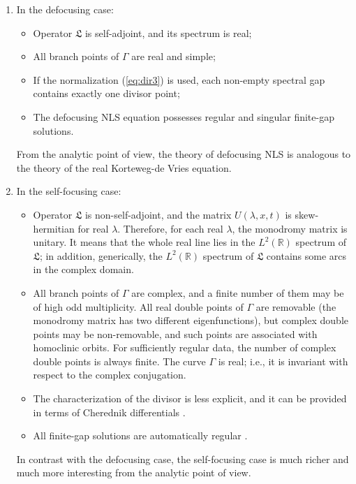 \documentclass[12pt]{article}
\newcommand{\RR}{\mathbb R}
\newcommand{\LG}{\mathfrak L}
\begin{document}
\begin{enumerate}
\item In the defocusing case:
\begin{itemize}
\item Operator $\LG$ is self-adjoint, and its spectrum is real; 
\item All branch points of $\Gamma$ are real and simple;
\item If the normalization (\ref{eq:dir3}) is used, each non-empty spectral gap contains exactly one divisor point;
\item The defocusing NLS equation possesses regular and singular finite-gap solutions. 
\end{itemize}
From the analytic point of view, the theory of defocusing NLS is analogous to the theory of the real Korteweg-de Vries equation.
\item In the self-focusing case:
\begin{itemize}
\item Operator $\LG$ is non-self-adjoint, and the matrix $U(\lambda,x,t)$ is skew-hermitian for real $\lambda$. Therefore, for each real $\lambda$, the monodromy matrix is unitary. It means that the whole real line lies in the $L^2(\RR)$ spectrum of $\LG$; in addition, generically, the $L^2(\RR)$ spectrum of $\LG$ contains some arcs in the complex domain.
\item All branch points of $\Gamma$ are complex, and a finite number of them may be of high odd multiplicity. All real double points of $\Gamma$ are removable (the monodromy matrix has two different eigenfunctions), but complex double points may be non-removable, and such points are associated with homoclinic orbits. For sufficiently regular data, the number of complex double points is always finite. The curve $\Gamma$ is real; i.e., it is invariant with respect to the complex conjugation. 
\item The characterization of the divisor is less explicit, and it can be provided in terms of Cherednik differentials \cite{Cher}. 
\item All finite-gap solutions are automatically regular \cite{Cher}.
\end{itemize}
In contrast with the defocusing case, the self-focusing case is much richer and much more interesting from the analytic point of view.
\end{enumerate}
\end{document}
